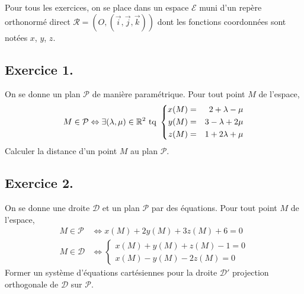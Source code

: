 Pour tous les exercices, on se place dans un espace $\mathcal{E}$ muni d'un repère orthonormé direct $\mathcal R = (O,(\overrightarrow i , \overrightarrow j , \overrightarrow k))$ dont les fonctions coordonnées sont notées $x$, $y$, $z$.
\subsection*{Exercice 1.}
On se donne un plan $\mathcal{P}$ de manière paramétrique. Pour tout point $M$ de l'espace,
\begin{displaymath}
 M\in \mathcal P \Leftrightarrow \exists(\lambda,\mu)\in \mathbb{R}^2 \text{ tq }
\left\lbrace 
\begin{aligned}
 x(M) &=& 2+\lambda-\mu\\
 y(M) &=& 3-\lambda+2\mu \\
 z(M) &=& 1 + 2\lambda +\mu
\end{aligned}
\right. 
\end{displaymath}
Calculer la distance d'un point $M$ au plan $\mathcal{P}$.

\subsection*{Exercice 2.}
On se donne une droite $\mathcal{D}$ et un plan $\mathcal{P}$ par des équations. Pour tout point $M$ de l'espace,
\begin{align*}
 M\in \mathcal{P}&\Leftrightarrow x(M) + 2y(M) + 3z(M)+6 = 0
\\
 M\in \mathcal{D}&\Leftrightarrow
\left\lbrace 
\begin{aligned}
 x(M) + y(M) + z(M) -1 = 0 \\
 x(M) - y(M)-2z(M) = 0
\end{aligned}
\right. 
\end{align*}
Former un système d'équations cartésiennes pour la droite $\mathcal{D}'$ projection orthogonale de $\mathcal D$ sur $\mathcal P$.


